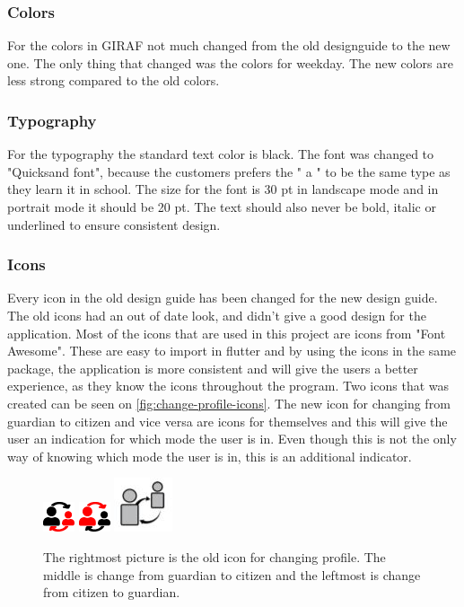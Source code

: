 \subsubsection{Colors}
For the colors in GIRAF not much changed from the old designguide to the new one. 
The only thing that changed was the colors for weekday.
The new colors are less strong compared to the old colors.

\subsubsection{Typography}
For the typography the standard text color is black. The font was changed to "Quicksand font", because the customers prefers the " a " to be the same type as they learn it in school.
The size for the font is 30 pt in landscape mode and in portrait mode it should be 20 pt.
The text should also never be bold, italic or underlined to ensure consistent design.

\subsubsection{Icons}
Every icon in the old design guide has been changed for the new design guide.
The old icons had an out of date look, and didn't give a good design for the application.
Most of the icons that are used in this project are icons from "Font Awesome".
These are easy to import in flutter and by using the icons in the same package, the application is more consistent and will give the users a better experience, as they know the icons throughout the program.
Two icons that was created can be seen on \autoref{fig:change-profile-icons}. 
The new icon for changing from guardian to citizen and vice versa are icons for themselves and this will give the user an indication for which mode the user is in.
Even though this is not the only way of knowing which mode the user is in, this is an additional indicator.

\begin{figure}[htp]

    \centering
    \includegraphics[width=.1\textwidth]{figures/changeToGuardian}\hfill
    \includegraphics[width=.1\textwidth]{figures/changeToCitizen}\hfill
    \includegraphics[width=.1\textwidth]{figures/old-change-profile}
    
    \caption{The rightmost picture is the old icon for changing profile. The middle is change from guardian to citizen and the leftmost is change from citizen to guardian.}
    \label{fig:change-profile-icons}
\end{figure}


